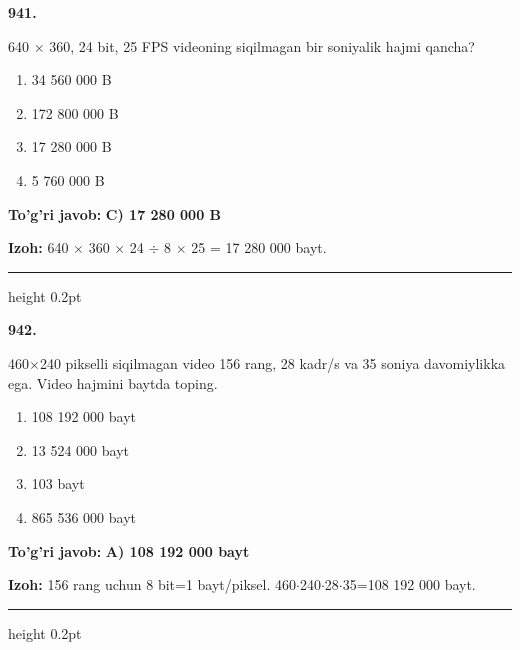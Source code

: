 \documentclass[10pt,a4paper,oneside]{article}
\begin{document}
\noindent\textbf{\color{ink}941.}
\par
640 \ensuremath{\times} 360, 24 bit, 25 FPS videoning siqilmagan bir soniyalik hajmi qancha?
\begin{enumerate}[label=\Alph*),leftmargin=9mm]
\item 34 560 000 B
\item 172 800 000 B
\item 17 280 000 B
\item 5 760 000 B
\end{enumerate}
\begin{tcolorbox}[enhanced,breakable,colback=teal!4,colframe=teal!50!black,boxrule=0.5pt,arc=1.1mm,left=3mm,right=3mm,top=1.7mm,bottom=1.7mm,before skip=2mm,after skip=2mm]
\textbf{\color{teal}To'g'ri javob:} \textbf{C) 17 280 000 B}
\par\smallskip
\textbf{Izoh:} 640 \ensuremath{\times} 360 \ensuremath{\times} 24 \ensuremath{\div} 8 \ensuremath{\times} 25 = 17 280 000 bayt.
\end{tcolorbox}
\vspace{2mm}\hrule height 0.2pt \vspace{3mm}

\noindent\textbf{\color{ink}942.}
\par
460\ensuremath{\times}240 pikselli siqilmagan video 156 rang, 28 kadr/s va 35 soniya davomiylikka ega. Video hajmini baytda toping.
\begin{enumerate}[label=\Alph*),leftmargin=9mm]
\item 108 192 000 bayt
\item 13 524 000 bayt
\item 103 bayt
\item 865 536 000 bayt
\end{enumerate}
\begin{tcolorbox}[enhanced,breakable,colback=teal!4,colframe=teal!50!black,boxrule=0.5pt,arc=1.1mm,left=3mm,right=3mm,top=1.7mm,bottom=1.7mm,before skip=2mm,after skip=2mm]
\textbf{\color{teal}To'g'ri javob:} \textbf{A) 108 192 000 bayt}
\par\smallskip
\textbf{Izoh:} 156 rang uchun 8 bit=1 bayt/piksel. 460\ensuremath{\cdot}240\ensuremath{\cdot}28\ensuremath{\cdot}35=108 192 000 bayt.
\end{tcolorbox}
\vspace{2mm}\hrule height 0.2pt \vspace{3mm}
\end{document}
